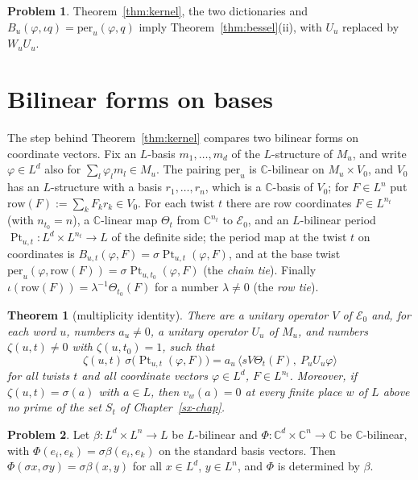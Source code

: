 \documentclass[reqno]{amsart}
\newcounter{chap}
\theoremstyle{definition}
\newtheorem{problem}{Problem}[section]
\theoremstyle{plain}
\newtheorem{theorem}{Theorem}[section]
\theoremstyle{remark}
\newcommand{\C}{\mathbb C}
\newcommand{\Ec}{\mathcal E}
\newcommand{\Pt}{\operatorname{Pt}}
\begin{document}
\begin{problem}\label{pr:assembly}
Theorem~\ref{thm:kernel}, the two dictionaries and \(B_u(\varphi,\iota q)=\mathrm{per}_u(\varphi,q)\) imply Theorem~\ref{thm:bessel}(ii), with \(U_u\) replaced by \(W_uU_u\).
\end{problem}

\section{Bilinear forms on bases}\label{sec:bases}

The step behind Theorem~\ref{thm:kernel} compares two bilinear forms on coordinate vectors.  Fix an \(L\)-basis \(m_1,\dots,m_d\) of the \(L\)-structure of \(M_u\), and write \(\varphi\in L^d\) also for \(\sum_l\varphi_lm_l\in M_u\).  The pairing \(\mathrm{per}_u\) is \(\C\)-bilinear on \(M_u\times V_0\), and \(V_0\) has an \(L\)-structure with a basis \(r_1,\dots,r_n\), which is a \(\C\)-basis of \(V_0\); for \(F\in L^n\) put \(\mathrm{row}(F):=\sum_kF_kr_k\in V_0\).  For each twist \(t\) there are row coordinates \(F\in L^{n_t}\) (with \(n_{t_0}=n\)), a \(\C\)-linear map \(\Theta_t\) from \(\C^{n_t}\) to \(\Ec_0\), and an \(L\)-bilinear period \(\Pt_{u,t}\colon L^d\times L^{n_t}\to L\) of the definite side; the period map at the twist \(t\) on coordinates is \(B_{u,t}(\varphi,F)=\sigma\Pt_{u,t}(\varphi,F)\), and at the base twist \(\mathrm{per}_u(\varphi,\mathrm{row}(F))=\sigma\Pt_{u,t_0}(\varphi,F)\) (the \emph{chain tie}).  Finally \(\iota(\mathrm{row}(F))=\lambda^{-1}\Theta_{t_0}(F)\) for a number \(\lambda\ne0\) (the \emph{row tie}).

\begin{theorem}[multiplicity identity]\label{thm:mult}
There are a unitary operator \(V\) of \(\Ec_0\) and, for each word \(u\), numbers \(a_u\ne0\), a unitary operator \(U_u\) of \(M_u\), and numbers \(\zeta(u,t)\ne0\) with \(\zeta(u,t_0)=1\), such that
\[
 \zeta(u,t)\,\sigma\bigl(\Pt_{u,t}(\varphi,F)\bigr)=a_u\,\bigl\langle sV\Theta_t(F),\ P_uU_u\varphi\bigr\rangle
\]
for all twists \(t\) and all coordinate vectors \(\varphi\in L^d\), \(F\in L^{n_t}\).  Moreover, if \(\zeta(u,t)=\sigma(a)\) with \(a\in L\), then \(v_w(a)=0\) at every finite place \(w\) of \(L\) above no prime of the set \(S_t\) of Chapter~\ref{sx-chap}.
\end{theorem}

\begin{problem}\label{pr:extend}
Let \(\beta\colon L^d\times L^n\to L\) be \(L\)-bilinear and \(\Phi\colon\C^d\times\C^n\to\C\) be \(\C\)-bilinear, with \(\Phi(e_i,e_k)=\sigma\beta(e_i,e_k)\) on the standard basis vectors.  Then \(\Phi(\sigma x,\sigma y)=\sigma\beta(x,y)\) for all \(x\in L^d\), \(y\in L^n\), and \(\Phi\) is determined by \(\beta\).
\end{problem}
\end{document}
